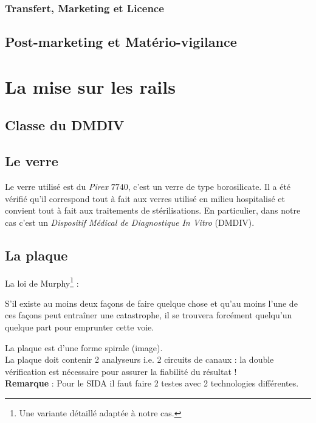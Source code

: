 \documentclass[a4paper,11pt]{article}
\newcommand{\rem}{\noindent\textbf{Remarque} : }
\begin{document}
\begin{sloppypar}
\subsubsection{Transfert, Marketing et Licence}

\subsection{Post-marketing et Matério-vigilance}


\section{La mise sur les rails}
\subsection{Classe du DMDIV}

\subsection{Le verre}
Le verre utilisé est du \emph{Pirex} $7740$, c'est un verre de type borosilicate. Il a été vérifié qu'il correspond tout à 
fait aux verres utilisé en milieu hospitalisé et convient tout à fait aux traitements de stérilisations.
En particulier, dans notre cas c'est un \emph{Dispositif Médical de Diagnostique In Vitro} (DMDIV).

\subsection{La plaque}
La loi de Murphy\footnote{Une variante détaillé adaptée à notre cas.} :
\begin{center}
 \og
 S'il existe au moins deux façons de faire quelque chose et qu'au moins l'une de ces façons peut entraîner une catastrophe, 
 il se trouvera forcément quelqu'un quelque part pour emprunter cette voie.
 \fg
\end{center}
\vspace{1.5ex}
La plaque est d'une forme spirale (image).\\

La plaque doit contenir 2 analyseurs i.e. 2 circuits de canaux : la double vérification est nécessaire pour assurer la fiabilité du résultat !\\

\rem Pour le SIDA il faut faire 2 testes avec 2 technologies différentes.


\end{sloppypar}
\end{document}
